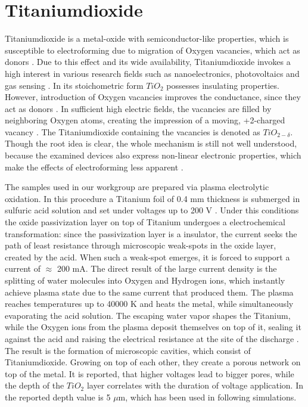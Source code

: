\documentclass[12pt]{article}
\begin{document}
\section{Titaniumdioxide}
	Titaniumdioxide is a metal-oxide with semiconductor-like properties, which is susceptible to electroforming due to migration of Oxygen vacancies, which act as donors \cite{Effect, Strungaru}. Due to this effect and its wide availability, Titaniumdioxide invokes a high interest in various research fields such as nanoelectronics, photovoltaics and gas sensing \cite{Strungaru, Dynamics}.
	In its stoichometric form $TiO_2$ possesses insulating properties. However, introduction of Oxygen vacancies improves the conductance, since they act as donors \cite{Strungaru}. In sufficient high electric fields, the vacancies are filled by neighboring Oxygen atoms, creating the impression of a moving, +2-charged vacancy \cite{Missing}. The Titaniumdioxide containing the vacancies is denoted as $TiO_{2-\delta}$. Though the root idea is clear, the whole mechanism is still not well understood, because the examined devices also express non-linear electronic properties, which make the effects of electroforming less apparent \cite{Family}.
	
	The samples used in our workgroup are prepared via plasma electrolytic oxidation. In this procedure a Titanium foil of 0.4 mm thickness is submerged in sulfuric acid solution and set under voltages up to 200 V \cite{Titan1}. Under this conditions the oxide passivization layer on top of Titanium undergoes a electrochemical transformation: since the passivization layer is a insulator, the current seeks the path of least resistance through microscopic weak-spots in the oxide layer, created by the acid. When such a weak-spot emerges, it is forced to support a current of $\approx$ 200 mA.
	The direct result of the large current density is the splitting of water molecules into Oxygen and Hydrogen ions, which instantly achieve plasma state due to the same current that produced them. The plasma reaches temperatures up to 40000 K \cite{Titan2} and heats the metal, while simultaneously evaporating the acid solution. The escaping water vapor shapes the Titanium, while the Oxygen ions from the plasma deposit themselves on top of it, sealing it against the acid and raising the electrical resistance at the site of the discharge \cite{Titan2}.
	The result is the formation of microscopic cavities, which consist of Titaniumdioxide. Growing on top of each other, they create a porous network on top of the metal. It is reported, that higher voltages lead to bigger pores, while the depth of the $TiO_2$ layer correlates with the duration of voltage application. In \cite{Dynamics} the reported depth value is 5 $\mu$m, which has been used in following simulations.
	
\end{document}
